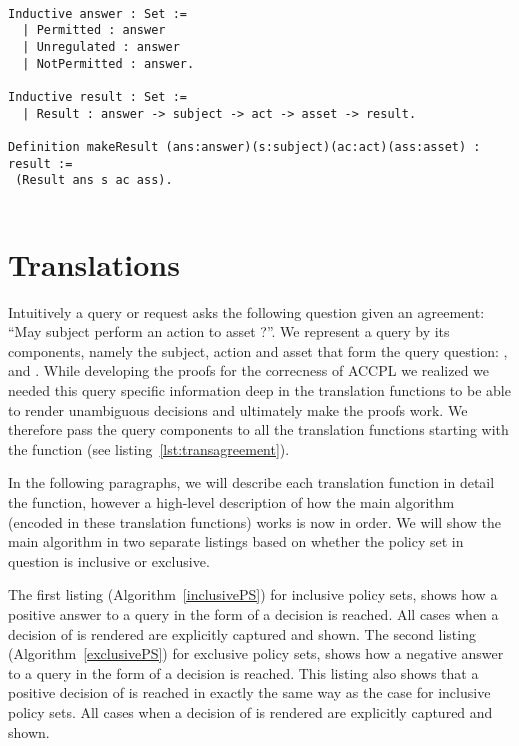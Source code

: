 \begin{minipage}[c]{0.95\textwidth}
\begin{lstlisting}

Inductive answer : Set :=
  | Permitted : answer
  | Unregulated : answer
  | NotPermitted : answer.
  
Inductive result : Set :=
  | Result : answer -> subject -> act -> asset -> result.
 
Definition makeResult (ans:answer)(s:subject)(ac:act)(ass:asset) : result := 
 (Result ans s ac ass).
 
\end{lstlisting}
\end{minipage}

\section{Translations}\label{sec:translationfuncs}

Intuitively a query or request asks the following question given an agreement: ``May subject  perform an action  to asset ?''. We represent a query by its components, namely the subject, action and asset that form the query question: ,  and . While developing the proofs for the correcness of \ac{ACCPL} we realized we needed this query specific information deep in the translation functions to be able to render unambiguous decisions and ultimately make the proofs work. We therefore pass the query components to all the translation functions starting with the  function (see listing~\ref{lst:transagreement}). 

In the following paragraphs, we will describe each translation function in detail the  function, however a high-level description of how the main algorithm (encoded in these translation functions) works is now in order. We will show the main algorithm in two separate listings based on whether the policy set in question is inclusive or exclusive. 

The first listing (Algorithm~\ref{inclusivePS}) for inclusive policy sets, shows how a positive answer to a query in the form of a  decision is reached. All cases when a decision of  is rendered are explicitly captured and shown. The second listing (Algorithm~\ref{exclusivePS}) for exclusive policy sets, shows how a negative answer to a query in the form of a  decision is reached. This listing also shows that a positive decision of  is reached in exactly the same way as the case for inclusive policy sets. All cases when a decision of  is rendered are explicitly captured and shown.

